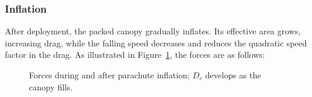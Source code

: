 \documentclass[12pt,a4paper]{article}
\numberwithin{equation}{section}
\newcommand{\figvar}[1]{{\itshape #1}}
\begin{document}
\subsubsection{Inflation}\label{sec:inflation}
After deployment, the packed canopy gradually inflates. Its effective area grows, increasing drag, while the falling speed decreases and reduces the quadratic speed factor in the drag. As illustrated in Figure~\ref{fig:canopyforces}, the forces are as follows:
\par
\begin{figure}[H]\centering
{}
\caption{Forces during and after parachute inflation; $D_c$ develops as the canopy fills.}\label{fig:canopyforces}
\end{figure}
\par
\end{document}

